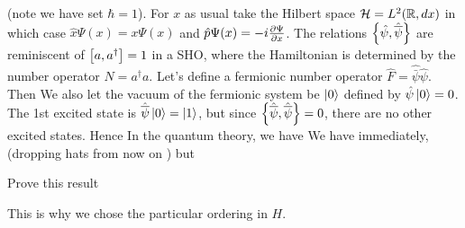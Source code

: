 \documentclass{article}
\begin{document}
(note we have set $\hbar=1$). For $x$ as usual take the Hilbert space $\mc{H} = L^2 ( \mbb{R}, dx)$ in which case $\hat{x} \Psi(x) = x\Psi(x)$ and $\hat{p} \Psi(x) = -i \pd[\Psi]{x}$. The relations $\acomm[\hat{\psi}]{\hat{\bar{\psi}}}$ are reminiscent of $\comm[a]{a^\dagger}=1$ in a SHO, where the Hamiltonian is determined by the number operator $N=a^\dagger a$. Let's define a fermionic number operator $\hat{F} = \hat{\bar{\psi}}\hat{\psi}$. Then 
\eq{
\comm[\hat{F}]{\hat{\psi}} &= -\hat{\psi} \\
\comm[\hat{F}]{\hat{\bar{\psi}}} &= \hat{\bar{\psi}}
}
We also let the vacuum of the fermionic system be $\ket{0}$ defined by $\hat{\psi}\ket{0}=0$. The 1st excited state is $\hat{\bar{\psi}}\ket{0} = \ket{1}$, but since $\acomm[\hat{\bar{\psi}}]{\hat{\bar{\psi}}}=0$, there are no other excited states. Hence 
In the quantum theory, we have 
We have immediately, (dropping hats from now on )
but 

\begin{ex}
Prove this result
\end{ex}

This is why we chose the particular ordering in $H$. 

\end{document}
